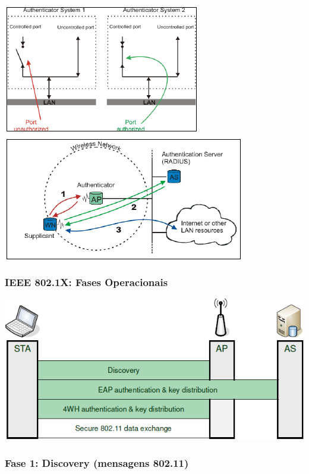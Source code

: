 \documentclass{article}
\begin{document}
\begin{center}
  \includegraphics[scale=0.8]{48}
  \includegraphics[scale=0.8]{49}
\end{center}

\subsubsection{IEEE 802.1X: Fases Operacionais}

\begin{center}
  \includegraphics[scale=0.6]{50}
\end{center}

\subsubsection*{Fase 1: Discovery (mensagens 802.11)}
\end{document}
